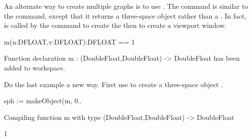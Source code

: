 
An alternate way to create multiple graphs is to use
.
The  command is similar to the 
command, except that it returns a three-space object rather than a
.
In fact,  is called by the 
command to create the  then
 to create a
viewport window.

\begin{xtc}
\begin{xtccomment}
\end{xtccomment}
\begin{spadsrc}
m(u:DFLOAT,v:DFLOAT):DFLOAT == 1 
\end{spadsrc}
\begin{MessageOutput}
   Function declaration m : (DoubleFloat,DoubleFloat) -> DoubleFloat 
      has been added to workspace.
\end{MessageOutput}
\end{xtc}
\begin{xtc}
\begin{xtccomment}
Do the last example a new way.
First use  to
create a three-space object .
\end{xtccomment}
\begin{spadsrc}
sph := makeObject(m, 0..%
\end{spadsrc}
\begin{MessageOutput}
   Compiling function m with type (DoubleFloat,DoubleFloat) -> 
      DoubleFloat 
\end{MessageOutput}
\begin{TeXOutput}
\begin{fricasmath}{2}
1%
\end{fricasmath}
\end{TeXOutput}
\end{xtc}
